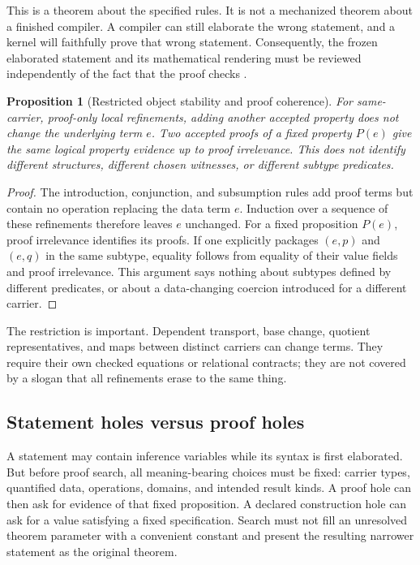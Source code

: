 \documentclass[11pt,a4paper]{article}
\newtheorem{proposition}[theorem]{Proposition}
\theoremstyle{definition}
\theoremstyle{remark}
\begin{document}
This is a theorem about the specified rules. It is not a mechanized theorem about a finished compiler. A compiler can still elaborate the wrong statement, and a kernel will faithfully prove that wrong statement. Consequently, the frozen elaborated statement and its mathematical rendering must be reviewed independently of the fact that the proof checks \cite{leanValidation}.

\begin{proposition}[Restricted object stability and proof coherence]
\label{prop:coherence}
For same-carrier, proof-only local refinements, adding another accepted property does not change the underlying term $e$. Two accepted proofs of a fixed property $P(e)$ give the same logical property evidence up to proof irrelevance. This does not identify different structures, different chosen witnesses, or different subtype predicates.
\end{proposition}
\begin{proof}
The introduction, conjunction, and subsumption rules add proof terms but contain no operation replacing the data term $e$. Induction over a sequence of these refinements therefore leaves $e$ unchanged. For a fixed proposition $P(e)$, proof irrelevance identifies its proofs. If one explicitly packages $(e,p)$ and $(e,q)$ in the same subtype, equality follows from equality of their value fields and proof irrelevance. This argument says nothing about subtypes defined by different predicates, or about a data-changing coercion introduced for a different carrier.
\end{proof}

The restriction is important. Dependent transport, base change, quotient representatives, and maps between distinct carriers can change terms. They require their own checked equations or relational contracts; they are not covered by a slogan that all refinements erase to the same thing.

\subsection{Statement holes versus proof holes}
A statement may contain inference variables while its syntax is first elaborated. But before proof search, all meaning-bearing choices must be fixed: carrier types, quantified data, operations, domains, and intended result kinds. A proof hole can then ask for evidence of that fixed proposition. A declared construction hole can ask for a value satisfying a fixed specification. Search must not fill an unresolved theorem parameter with a convenient constant and present the resulting narrower statement as the original theorem.
\end{document}
